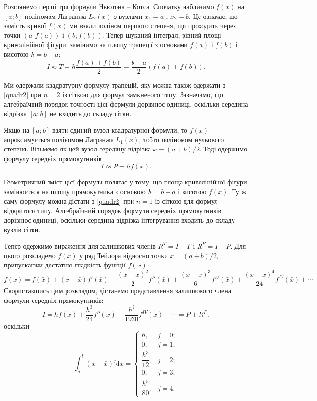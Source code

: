\documentclass[14pt,twoside]{extreport}
\theoremstyle{mystyle}
\numberwithin{equation}{chapter}
\begin{document}
Розглянемо перші три формули Ньютона -- Котса. Спочатку наблизимо $f(x)$ на $[a; b]$ поліномом Лагранжа $L_2(x)$ з вузлами $x_1 = a$ і $x_2 = b$. Це означає, що замість кривої $f(x)$ ми взяли поліном першого степеня, що проходить через точки $(a; f(a))$ і $(b; f(b))$. Тепер шуканий інтеграл, рівний площі криволінійної фігури, замінимо на площу трапеції з основами $f(a)$ і $f(b)$ і висотою $h = b - a$:
\begin{equation}\label{quadr3}
I\displaystyle \approx T=h\frac{f(a)+f(b)}{2}=\frac{b-a}{2}(f(a)+f(b)).
\end{equation}

Ми одержали квадратурну формулу трапецій, яку можна також одержати з \eqref{quadr2} при $n = 2$ із сіткою для формул замкненого типу. Зазначимо, що алгебраїчний порядок точності цієї формули дорівнює одиниці, оскільки середина відрізка $[a; b]$ не входить до складу сітки.

Якщо на $[a; b]$ взяти єдиний вузол квадратурної формули, то $f(x)$ апроксимується поліномом Лагранжа $L_1(x)$, тобто поліномом нульового степеня. Візьмемо як цей вузол середину відрізка $\bar{x} = (a + b)/2$. Тоді одержимо формулу середніх прямокутників
\begin{equation}\label{quadr4}
I\approx P=hf(\bar{x}).
\end{equation}

Геометричний зміст цієї формули полягає у тому, що площа криволінійної фігури замінюється на площу прямокутника з основою $h = b - a$ і висотою $f(\bar{x})$. Ту ж саму формулу можна дістати з \eqref{quadr2} при $n = 1$ із сіткою для формул відкритого типу. Алгебраїчний порядок формули середніх прямокутників дорівнює одиниці, оскільки середина відрізка інтегрування входить до складу вузлів сітки.

Тепер одержимо вираження для залишкових членів $R^{T} = I - T$ і $R^{P} = I - P$. Для цього розкладемо $f(x)$ у ряд Тейлора відносно точки $\bar{x} = (a + b)/2$, припускаючи достатню гладкість функції $f(x)$:
\begin{equation}\label{quadr5}
f(x) = f(\bar{x})+(x-\bar{x})f'(\bar{x})+\frac{(x-\bar{x})^{2}}{2}f''(\bar{x})+\frac{(x-\bar{x})^{3}}{6}f'''(\bar{x})+\frac{(x-\bar{x})^{4}}{24}f^{IV}(\bar{x})+\cdots
\end{equation}
Скориставшись цим розкладом, дістанемо представлення залишкового члена формули середніх прямокутників:
\begin{equation}\label{quadr6}
I=hf(\displaystyle \bar{x})+\frac{h^{3}}{24}f''(\bar{x})+\frac{h^{5}}{1920}f^{IV}(\bar{x})+\cdots=P+R^{P},
\end{equation}
оскільки
\[
\int_{a}^{b} (x - \bar{x})^{j} \mathrm{d}x = \left\{
\begin{array}{ll}
h, & j=0;\\
0, & j=1;\\
\dfrac{h^3}{12}, & j=2;\\
0, & j=3;\\
\dfrac{h^5}{80}, & j=4.
\end{array}
\right.
\]
\end{document}
